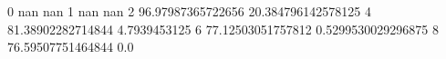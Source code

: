 0 nan nan
1 nan nan
2 96.97987365722656 20.384796142578125
4 81.38902282714844 4.7939453125
6 77.12503051757812 0.5299530029296875
8 76.59507751464844 0.0
